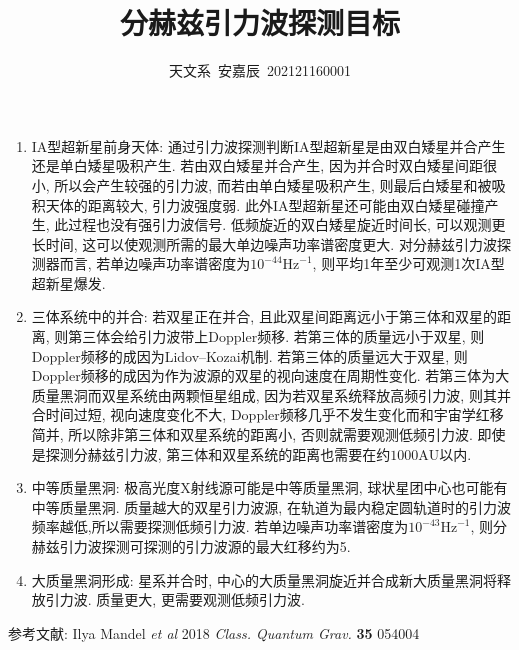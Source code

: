 \documentclass[12pt]{ctexart}
\title{分赫兹引力波探测目标}
\author{天文系\ 安嘉辰\ 202121160001}
\theoremstyle{definition}
\begin{document}
    \maketitle
    \begin{enumerate}
        \item IA型超新星前身天体: 通过引力波探测判断IA型超新星是由双白矮星并合产生还是单白矮星吸积产生. 若由双白矮星并合产生, 因为并合时双白矮星间距很小, 所以会产生较强的引力波, 而若由单白矮星吸积产生, 则最后白矮星和被吸积天体的距离较大, 引力波强度弱. 此外IA型超新星还可能由双白矮星碰撞产生, 此过程也没有强引力波信号. 低频旋近的双白矮星旋近时间长, 可以观测更长时间, 这可以使观测所需的最大单边噪声功率谱密度更大. 对分赫兹引力波探测器而言, 若单边噪声功率谱密度为$10^{-44}\text{Hz}^{-1}$, 则平均1年至少可观测1次IA型超新星爆发.
        \item 三体系统中的并合: 若双星正在并合, 且此双星间距离远小于第三体和双星的距离, 则第三体会给引力波带上Doppler频移. 若第三体的质量远小于双星, 则Doppler频移的成因为Lidov--Kozai机制. 若第三体的质量远大于双星, 则Doppler频移的成因为作为波源的双星的视向速度在周期性变化. 若第三体为大质量黑洞而双星系统由两颗恒星组成, 因为若双星系统释放高频引力波, 则其并合时间过短, 视向速度变化不大, Doppler频移几乎不发生变化而和宇宙学红移简并, 所以除非第三体和双星系统的距离小, 否则就需要观测低频引力波. 即使是探测分赫兹引力波, 第三体和双星系统的距离也需要在约$1000\text{AU}$以内.
        \item 中等质量黑洞: 极高光度X射线源可能是中等质量黑洞, 球状星团中心也可能有中等质量黑洞. 质量越大的双星引力波源, 在轨道为最内稳定圆轨道时的引力波频率越低,所以需要探测低频引力波. 若单边噪声功率谱密度为$10^{-43}\text{Hz}^{-1}$, 则分赫兹引力波探测可探测的引力波源的最大红移约为5.
        \item 大质量黑洞形成: 星系并合时, 中心的大质量黑洞旋近并合成新大质量黑洞将释放引力波. 质量更大, 更需要观测低频引力波.
    \end{enumerate}
    参考文献: Ilya Mandel \textit{et al} 2018 \textit{Class. Quantum Grav.} \textbf{35} 054004
\end{document}

